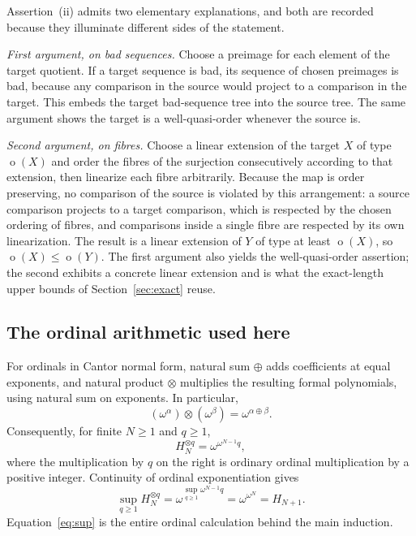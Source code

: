 \documentclass[11pt,a4paper]{article}
\numberwithin{equation}{section}
\theoremstyle{definition}
\theoremstyle{remark}
\newcommand{\mot}{\mathop{o}}
\begin{document}
Assertion~(ii) admits two elementary explanations, and both are recorded
because they illuminate different sides of the statement.

\emph{First argument, on bad sequences.}
Choose a preimage for each element of the target quotient. If a target
sequence is bad, its sequence of chosen preimages is bad, because any
comparison in the source would project to a comparison in the target.
This embeds the target bad-sequence tree into the source tree. The same
argument shows the target is a well-quasi-order whenever the source is.

\emph{Second argument, on fibres.}
Choose a linear extension of the target $X$ of type $\mot(X)$ and order the
fibres of the surjection consecutively according to that extension, then
linearize each fibre arbitrarily. Because the map is order preserving, no
comparison of the source is violated by this arrangement: a source comparison
projects to a target comparison, which is respected by the chosen ordering of
fibres, and comparisons inside a single fibre are respected by its own
linearization. The result is a linear extension of $Y$ of type at least
$\mot(X)$, so $\mot(X)\le\mot(Y)$. The first argument also yields the
well-quasi-order assertion; the second exhibits a concrete linear extension
and is what the exact-length upper bounds of Section~\ref{sec:exact} reuse.

\subsection{The ordinal arithmetic used here}
For ordinals in Cantor normal form, natural sum $\oplus$ adds coefficients
at equal exponents, and natural product $\otimes$ multiplies the resulting
formal polynomials, using natural sum on exponents. In particular,
\[
 (\omega^\alpha)\otimes(\omega^\beta)=\omega^{\alpha\oplus\beta}.
\]
Consequently, for finite $N\ge1$ and $q\ge1$,
\begin{equation}\label{eq:power}
 H_N^{\otimes q}=\omega^{\omega^{N-1}q},
\end{equation}
where the multiplication by $q$ on the right is ordinary ordinal
multiplication by a positive integer. Continuity of ordinal exponentiation
gives
\begin{equation}\label{eq:sup}
 \sup_{q\ge1}H_N^{\otimes q}
 =\omega^{\sup_{q\ge1}\omega^{N-1}q}
 =\omega^{\omega^N}=H_{N+1}.
\end{equation}
Equation~\eqref{eq:sup} is the entire ordinal calculation behind the
main induction.
\end{document}
